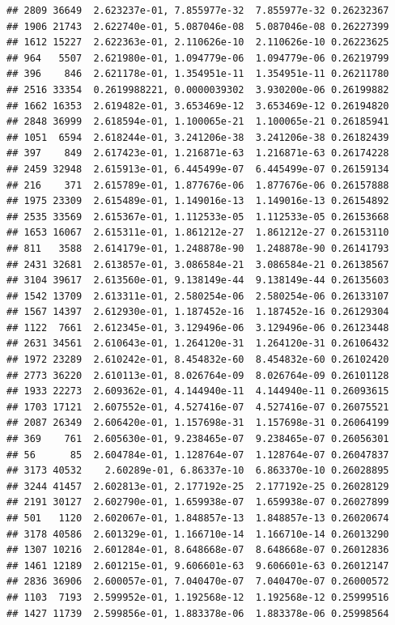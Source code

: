 \documentclass[
]{article}
\begin{document}
\begin{verbatim}
## 2809 36649  2.623237e-01, 7.855977e-32  7.855977e-32 0.26232367
## 1906 21743  2.622740e-01, 5.087046e-08  5.087046e-08 0.26227399
## 1612 15227  2.622363e-01, 2.110626e-10  2.110626e-10 0.26223625
## 964   5507  2.621980e-01, 1.094779e-06  1.094779e-06 0.26219799
## 396    846  2.621178e-01, 1.354951e-11  1.354951e-11 0.26211780
## 2516 33354  0.2619988221, 0.0000039302  3.930200e-06 0.26199882
## 1662 16353  2.619482e-01, 3.653469e-12  3.653469e-12 0.26194820
## 2848 36999  2.618594e-01, 1.100065e-21  1.100065e-21 0.26185941
## 1051  6594  2.618244e-01, 3.241206e-38  3.241206e-38 0.26182439
## 397    849  2.617423e-01, 1.216871e-63  1.216871e-63 0.26174228
## 2459 32948  2.615913e-01, 6.445499e-07  6.445499e-07 0.26159134
## 216    371  2.615789e-01, 1.877676e-06  1.877676e-06 0.26157888
## 1975 23309  2.615489e-01, 1.149016e-13  1.149016e-13 0.26154892
## 2535 33569  2.615367e-01, 1.112533e-05  1.112533e-05 0.26153668
## 1653 16067  2.615311e-01, 1.861212e-27  1.861212e-27 0.26153110
## 811   3588  2.614179e-01, 1.248878e-90  1.248878e-90 0.26141793
## 2431 32681  2.613857e-01, 3.086584e-21  3.086584e-21 0.26138567
## 3104 39617  2.613560e-01, 9.138149e-44  9.138149e-44 0.26135603
## 1542 13709  2.613311e-01, 2.580254e-06  2.580254e-06 0.26133107
## 1567 14397  2.612930e-01, 1.187452e-16  1.187452e-16 0.26129304
## 1122  7661  2.612345e-01, 3.129496e-06  3.129496e-06 0.26123448
## 2631 34561  2.610643e-01, 1.264120e-31  1.264120e-31 0.26106432
## 1972 23289  2.610242e-01, 8.454832e-60  8.454832e-60 0.26102420
## 2773 36220  2.610113e-01, 8.026764e-09  8.026764e-09 0.26101128
## 1933 22273  2.609362e-01, 4.144940e-11  4.144940e-11 0.26093615
## 1703 17121  2.607552e-01, 4.527416e-07  4.527416e-07 0.26075521
## 2087 26349  2.606420e-01, 1.157698e-31  1.157698e-31 0.26064199
## 369    761  2.605630e-01, 9.238465e-07  9.238465e-07 0.26056301
## 56      85  2.604784e-01, 1.128764e-07  1.128764e-07 0.26047837
## 3173 40532    2.60289e-01, 6.86337e-10  6.863370e-10 0.26028895
## 3244 41457  2.602813e-01, 2.177192e-25  2.177192e-25 0.26028129
## 2191 30127  2.602790e-01, 1.659938e-07  1.659938e-07 0.26027899
## 501   1120  2.602067e-01, 1.848857e-13  1.848857e-13 0.26020674
## 3178 40586  2.601329e-01, 1.166710e-14  1.166710e-14 0.26013290
## 1307 10216  2.601284e-01, 8.648668e-07  8.648668e-07 0.26012836
## 1461 12189  2.601215e-01, 9.606601e-63  9.606601e-63 0.26012147
## 2836 36906  2.600057e-01, 7.040470e-07  7.040470e-07 0.26000572
## 1103  7193  2.599952e-01, 1.192568e-12  1.192568e-12 0.25999516
## 1427 11739  2.599856e-01, 1.883378e-06  1.883378e-06 0.25998564

\end{verbatim}
\end{document}
